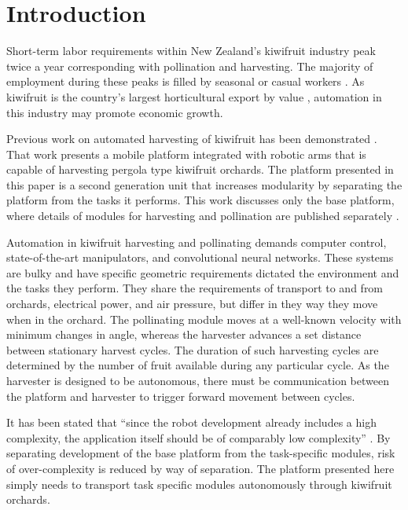 \documentclass[preprint,authoryear,12pt]{elsarticle}
\begin{document}

\section{Introduction}
\label{sect:intro}
    Short-term labor requirements within New Zealand's kiwifruit industry peak twice a year corresponding with pollination and harvesting.
    The majority of employment during these peaks is filled by seasonal or casual workers \citep{Timmins2009}.
    As kiwifruit is the country's largest horticultural export by value \citep{StatisticsNewZealand2015}, automation in this industry may promote economic growth.

    Previous work on automated harvesting of kiwifruit has been demonstrated \citep{Scarfe2012,scarfe2009}.
    That work presents a mobile platform integrated with robotic arms that is capable of harvesting pergola type kiwifruit orchards.
    The platform presented in this paper is a second generation unit that increases modularity by separating the platform from the tasks it performs.
    This work discusses only the base platform, where details of modules for harvesting and pollination are published separately \citep{williams2017,Seabright2017}.

    Automation in kiwifruit harvesting and pollinating demands computer control, state-of-the-art manipulators, and convolutional neural networks.
    These systems are bulky and have specific geometric requirements dictated the environment and the tasks they perform.
    They share the requirements of transport to and from orchards, electrical power, and air pressure, but differ in they way they move when in the orchard.
    The pollinating module moves at a well-known velocity with minimum changes in angle, whereas the harvester advances a set distance between stationary harvest cycles.
    The duration of such harvesting cycles are determined by the number of fruit available during any particular cycle.
    As the harvester is designed to be autonomous, there must be communication between the platform and harvester to trigger forward movement between cycles.

    It has been stated that ``since the robot development already includes a high complexity, the application itself should be of comparably low complexity'' \citep{Ruckelshausen2009}.
    By separating development of the base platform from the task-specific modules, risk of over-complexity is reduced by way of separation.
    The platform presented here simply needs to transport task specific modules autonomously through kiwifruit orchards.
\end{document}
